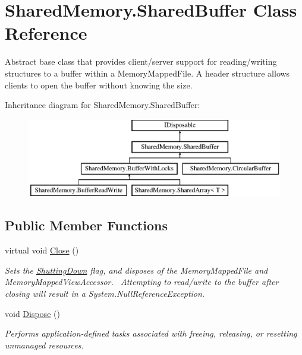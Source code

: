 \hypertarget{class_shared_memory_1_1_shared_buffer}{}\section{Shared\+Memory.\+Shared\+Buffer Class Reference}
\label{class_shared_memory_1_1_shared_buffer}


Abstract base class that provides client/server support for reading/writing structures to a buffer within a Memory\+Mapped\+File. A header structure allows clients to open the buffer without knowing the size.  


Inheritance diagram for Shared\+Memory.\+Shared\+Buffer\+:\begin{figure}[H]
\begin{center}
\leavevmode
\includegraphics[height=3.456790cm]{class_shared_memory_1_1_shared_buffer}
\end{center}
\end{figure}
\subsection*{Public Member Functions}
\begin{DoxyCompactItemize}
\item 
virtual void \hyperlink{class_shared_memory_1_1_shared_buffer_a137e5d49a530fd990c6d22d30b92250a}{Close} ()
\begin{DoxyCompactList}\small\item\em Sets the \hyperlink{class_shared_memory_1_1_shared_buffer_a598ee38e06ba63929f51946963694b72}{Shutting\+Down} flag, and disposes of the Memory\+Mapped\+File and Memory\+Mapped\+View\+Accessor.~\newline
 Attempting to read/write to the buffer after closing will result in a System.\+Null\+Reference\+Exception. \end{DoxyCompactList}\item 
void \hyperlink{class_shared_memory_1_1_shared_buffer_ab6e7d8bec7cdce8c450ff697c151ea36}{Dispose} ()
\begin{DoxyCompactList}\small\item\em Performs application-\/defined tasks associated with freeing, releasing, or resetting unmanaged resources. \end{DoxyCompactList}\end{DoxyCompactItemize}
